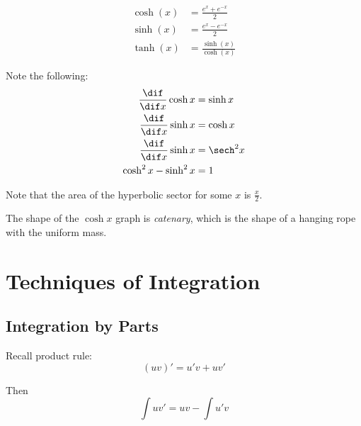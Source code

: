 \documentclass[11pt]{scrartcl}
\begin{document}
\begin{definition}
  \begin{align}
    \cosh(x) & = \frac{e^x+e^{-x}}{2} \\
    \sinh(x) & = \frac{e^x-e^{-x}}{2} \\
    \tanh(x) & = \frac{\sinh(x)}{\cosh(x)}
  \end{align}
\end{definition}

Note the following:
\begin{align}
  \frac{\dif }{\dif x}\cosh x & = \sinh x     \\
  \frac{\dif }{\dif x}\sinh x & = \cosh x     \\
  \frac{\dif }{\dif x}\sinh x & = \sech^{2} x \\
  \cosh^2 x -\sinh^2x         & =1
\end{align}

Note that the area of the hyperbolic sector for some $x$ is $\frac{x}{2}$.

The shape of the $\cosh x$ graph is \textit{catenary}, which is the
shape of a hanging rope with the uniform mass.


\section{Techniques of Integration}
\subsection{Integration by Parts}
Recall product rule:
\[(uv)' = u'v + uv'\]

Then
\[\int uv' = uv - \int u' v \]
\end{document}
